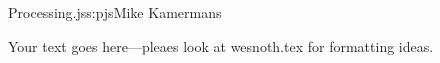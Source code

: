 \begin{aosachapter}{Processing.js}{s:pjs}{Mike Kamermans}

Your text goes here---pleaes look at wesnoth.tex for formatting ideas.

\end{aosachapter}
